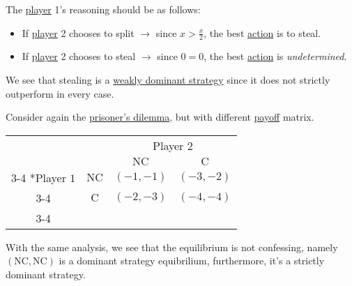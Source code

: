 \begin{eg}
	The \hyperref[def:player]{player} 1's reasoning should be as follows:
	\begin{itemize}
		\item If \hyperref[def:player]{player} 2 chooses to split \(\to \) since \(x>\frac{x}{2}\), the best \hyperref[def:strategy]{action} is to steal.
		\item If \hyperref[def:player]{player} 2 chooses to steal \(\to \) since \(0=0\), the best \hyperref[def:strategy]{action} is \emph{undetermined}.
	\end{itemize}

	We see that stealing is a \hyperref[def:weakly-dominant-strategy]{weakly dominant strategy} since it does not strictly outperform in every case.
\end{eg}

\begin{eg}\label{eg:prisoner-dilemma-ver2}
	Consider again the \hyperref[eg:prisoner-dilemma]{prisoner's dilemma}, but with different \hyperref[def:reward]{payoff} matrix.
	\begin{table}[H]
		\centering
		\setlength{\extrarowheight}{2pt}
		\begin{tabular}{cc|c|c|}
			                          & \multicolumn{1}{c}{} & \multicolumn{2}{c}{Player $2$}                                       \\
			                          & \multicolumn{1}{c}{} & \multicolumn{1}{c}{$\mathrm{NC}$} & \multicolumn{1}{c}{$\mathrm{C}$} \\\cline{3-4}
			\multirow{2}*{Player $1$} & $\mathrm{NC}$        & $(-1, -1)$                        & $(-3, -2)$                       \\\cline{3-4}
			                          & $\mathrm{C}$         & $(-2, -3)$                        & $(-4, -4)$                       \\\cline{3-4}
		\end{tabular}
	\end{table}
	With the same analysis, we see that the equilibrium is not confessing, namely \((\mathrm{NC}, \mathrm{NC})\) is a dominant strategy equibrilium, furthermore, it's a
	strictly dominant strategy.
\end{eg}

